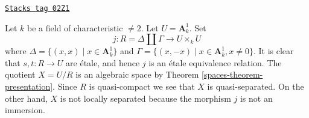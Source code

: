 \begin{example}
\label{spaces-example-affine-line-involution}
\href{https://stacks.math.columbia.edu/tag/02Z1}{\texttt{Stacks tag 02Z1}}

Let $k$ be a field of characteristic $\not = 2$. Let $U = \mathbf{A}^1_k$. Set
$$
j : R = \Delta \amalg \Gamma \longrightarrow U \times_k U
$$
where $\Delta = \{(x, x) \mid x \in \mathbf{A}^1_k\}$ and
$\Gamma = \{(x, -x) \mid x \in \mathbf{A}^1_k, x \not = 0\}$.
It is clear that $s, t : R \to U$ are \'etale, and hence
$j$ is an \'etale equivalence relation.
The quotient $X = U/R$ is an algebraic space by
Theorem \ref{spaces-theorem-presentation}.
Since $R$ is quasi-compact we see that $X$ is quasi-separated.
On the other hand, $X$ is not locally separated because
the morphism $j$ is not an immersion.
\end{example}

